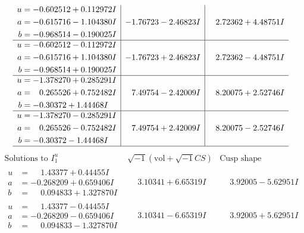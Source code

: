 \documentclass[1p]{elsarticle_modified}
\theoremstyle{definition}
\newcommand{\I}{\sqrt{-1}}
\begin{document}
$$\begin{array}{c|c|c}
\begin{aligned}
u &= -0.602512 + 0.112972 I \\
a &= -0.615716 - 1.104380 I \\
b &= -0.968514 - 0.190025 I\end{aligned}
 & -1.76723 - 2.46823 I & \phantom{-}2.72362 + 4.48751 I \\ \hline\begin{aligned}
u &= -0.602512 - 0.112972 I \\
a &= -0.615716 + 1.104380 I \\
b &= -0.968514 + 0.190025 I\end{aligned}
 & -1.76723 + 2.46823 I & \phantom{-}2.72362 - 4.48751 I \\ \hline\begin{aligned}
u &= -1.378270 + 0.285291 I \\
a &= \phantom{-}0.265526 + 0.752482 I \\
b &= -0.30372 + 1.44468 I\end{aligned}
 & \phantom{-}7.49754 - 2.42009 I & \phantom{-}8.20075 + 2.52746 I \\ \hline\begin{aligned}
u &= -1.378270 - 0.285291 I \\
a &= \phantom{-}0.265526 - 0.752482 I \\
b &= -0.30372 - 1.44468 I\end{aligned}
 & \phantom{-}7.49754 + 2.42009 I & \phantom{-}8.20075 - 2.52746 I\\
 \hline 
 \end{array}$$\newpage$$\begin{array}{c|c|c}  
\text{Solutions to }I^u_{1}& \I (\text{vol} + \sqrt{-1}CS) & \text{Cusp shape}\\
 \hline 
\begin{aligned}
u &= \phantom{-}1.43377 + 0.44455 I \\
a &= -0.268209 + 0.659406 I \\
b &= \phantom{-}0.094833 + 1.327870 I\end{aligned}
 & \phantom{-}3.10341 + 6.65319 I & \phantom{-}3.92005 - 5.62951 I \\ \hline\begin{aligned}
u &= \phantom{-}1.43377 - 0.44455 I \\
a &= -0.268209 - 0.659406 I \\
b &= \phantom{-}0.094833 - 1.327870 I\end{aligned}
 & \phantom{-}3.10341 - 6.65319 I & \phantom{-}3.92005 + 5.62951 I \\ \hline\begin{aligned}

\end{aligned}
\end{array}$$
\end{document}
